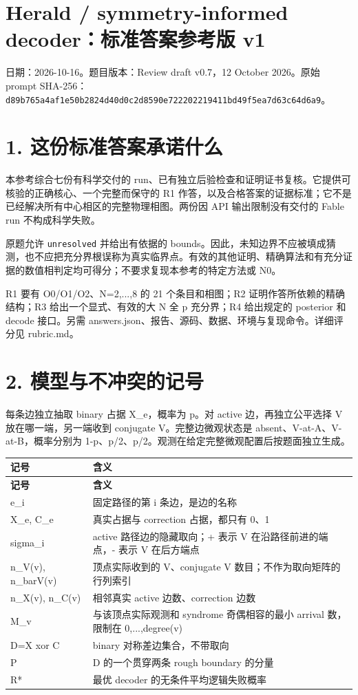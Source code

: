 \documentclass[11pt,a4paper]{article}
\begin{document}
\section*{Herald / symmetry-informed decoder：标准答案参考版 v1}

日期：2026-10-16。题目版本：Review draft v0.7，12 October 2026。原始 prompt SHA-256：\nolinkurl{d89b765a4af1e50b2824d40d0c2d8590e722202219411bd49f5ea7d63c64d6a9}。

\section*{1. 这份标准答案承诺什么}

本参考综合七份有科学交付的 run、已有独立后验检查和证明证书复核。它提供可核验的正确核心、一个完整而保守的 R1 作答，以及合格答案的证据标准；它不是已经解决所有中心相区的完整物理相图。两份因 API 输出限制没有交付的 Fable run 不构成科学失败。

原题允许 \nolinkurl{unresolved} 并给出有依据的 bounds。因此，未知边界不应被填成猜测，也不应把充分界根误称为真实临界点。有效的其他证明、精确算法和有充分证据的数值相判定均可得分；不要求复现本参考的特定方法或 N0。

R1 要有 O0/O1/O2、N=2,...,8 的 21 个条目和相图；R2 证明作答所依赖的精确结构；R3 给出一个显式、有效的大 N 全 p 充分界；R4 给出规定的 posterior 和 decode 接口。另需 answers.json、报告、源码、数据、环境与复现命令。详细评分见 rubric.md。

\section*{2. 模型与不冲突的记号}

每条边独立抽取 binary 占据 X\_e，概率为 p。对 active 边，再独立公平选择 V 放在哪一端，另一端收到 conjugate V。完整边微观状态是 absent、V-at-A、V-at-B，概率分别为 1-p、p/2、p/2。观测在给定完整微观配置后按题面独立生成。

{\fontsize{9}{12.5}\selectfont
\setlength{\tabcolsep}{2.2pt}

\begin{longtable}{>{\raggedright\arraybackslash}p{}>{\raggedright\arraybackslash}p{}}
\toprule
\textbf{记号} & \textbf{含义}\tabularnewline
\midrule
\endfirsthead
\toprule
\textbf{记号} & \textbf{含义}\tabularnewline
\midrule
\endhead
{}e\_i & 固定路径的第 i 条边，是边的名称\tabularnewline
{}X\_e, C\_e & 真实占据与 correction 占据，都只有 0、1\tabularnewline
{}sigma\_i & active 路径边的隐藏取向；+ 表示 V 在沿路径前进的端点，- 表示 V 在后方端点\tabularnewline
{}n\_V(v), n\_barV(v) & 顶点实际收到的 V、conjugate V 数目；不作为取向矩阵的行列索引\tabularnewline
{}n\_X(v), n\_C(v) & 相邻真实 active 边数、correction 边数\tabularnewline
{}M\_v & 与该顶点实际观测和 syndrome 奇偶相容的最小 arrival 数，限制在 0,...,degree(v)\tabularnewline
{}D=X xor C & binary 对称差边集合，不带取向\tabularnewline
{}P & D 的一个贯穿两条 rough boundary 的分量\tabularnewline
{}R* & 最优 decoder 的无条件平均逻辑失败概率\tabularnewline
\bottomrule
\end{longtable}
}
\end{document}
